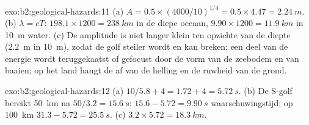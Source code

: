 \begin{solution}{exo:b2:geological-hazards:11}
(a) $A = 0.5 \times (4000/10)^{1/4} = 0.5 \times 4.47 = \qty{2.24}{m}$. (b) $\lambda = cT$:
$198.1 \times 1200 = \qty{238}{km}$ in de diepe oceaan, $9.90 \times 1200 = \qty{11.9}{km}$ in
\qty{10}{m} water. (c) De amplitude is niet langer klein ten opzichte van de diepte (\qty{2.2}{m} in
\qty{10}{m}), zodat de golf steiler wordt en kan breken; een deel van de energie wordt teruggekaatst of gefocust door de
vorm van de zeebodem en van baaien; op het land hangt de  af van de helling en de ruwheid van de
grond.
\end{solution}

\begin{solution}{exo:b2:geological-hazards:12}
(a) $10/5.8 + 4 = 1.72 + 4 = \qty{5.72}{s}$. (b) De S-golf bereikt \qty{50}{km} na $50/3.2 =
\qty{15.6}{s}$: $15.6 - 5.72 = \qty{9.90}{s}$ waarschuwingstijd; op \qty{100}{km} $31.3 - 5.72 =
\qty{25.5}{s}$. (c) $3.2 \times 5.72 = \qty{18.3}{km}$.
\end{solution}

